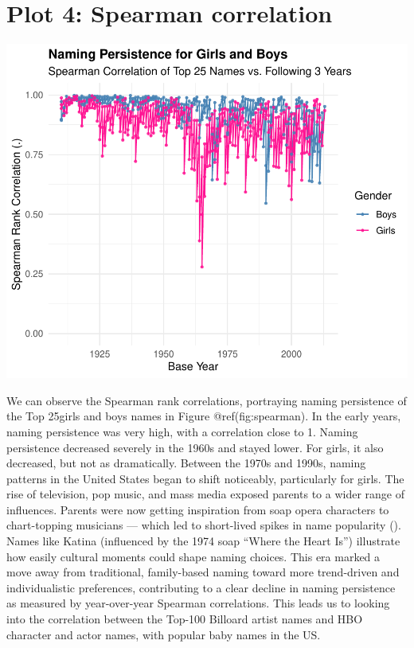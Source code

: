 \documentclass[11pt,preprint]{elsarticle}
\let\origfigure\figure
\let\endorigfigure\endfigure
\renewenvironment{figure}[1][2] {
    \expandafter\origfigure\expandafter[H]
} {
    \endorigfigure
}
\numberwithin{equation}{section}
\numberwithin{figure}{section}
\numberwithin{table}{section}
\begin{document}
\newpage

\section{Plot 4: Spearman
correlation}\label{plot-4-spearman-correlation}

\begin{figure}
\centering
\includegraphics{Question1_files/figure-latex/fig.spearman-1.pdf}
\caption{Figure: Spearman correlation for naming persistence over time}
\end{figure}

We can observe the Spearman rank correlations, portraying naming
persistence of the Top 25girls and boys names in Figure
@ref(fig:spearman). In the early years, naming persistence was very
high, with a correlation close to 1. Naming persistence decreased
severely in the 1960s and stayed lower. For girls, it also decreased,
but not as dramatically. Between the 1970s and 1990s, naming patterns in
the United States began to shift noticeably, particularly for girls. The
rise of television, pop music, and mass media exposed parents to a wider
range of influences. Parents were now getting inspiration from soap
opera characters to chart-topping musicians --- which led to short-lived
spikes in name popularity
(). Names like
Katina (influenced by the 1974 soap ``Where the Heart Is'') illustrate
how easily cultural moments could shape naming choices. This era marked
a move away from traditional, family-based naming toward more
trend-driven and individualistic preferences, contributing to a clear
decline in naming persistence as measured by year-over-year Spearman
correlations. This leads us to looking into the correlation between the
Top-100 Billoard artist names and HBO character and actor names, with
popular baby names in the US.
\end{document}
